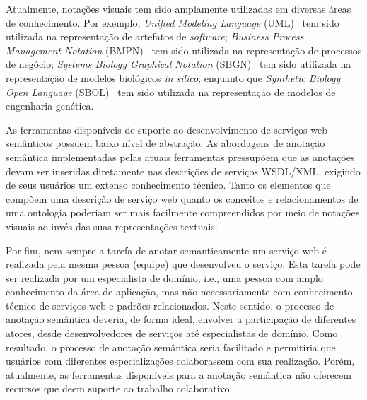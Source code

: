Atualmente, notações visuais tem sido amplamente utilizadas em diversas áreas de conhecimento. Por exemplo, \textit{Unified Modeling Language} (UML)~\cite{OMG-2017-UML} tem sido utilizada na representação de artefatos de \textit{software}; \textit{Business Process Management Notation} (BMPN)~\cite{OMG-2011-BPMN} tem sido utilizada na representação de processos de negócio; \textit{Systems Biology Graphical Notation} (SBGN)~\cite{NOVERE-BUCKA-MI-MOODIE-SCHREIBER-SOROKIN-2009-SBGN, VASUNDRA-LENOVERE-WALTEMATH-WOLKENHAUER-2018-SBGN} tem sido utilizada na representação de modelos biológicos \textit{in silico}; enquanto que \textit{Synthetic Biology Open Language} (SBOL)~\cite{QUINN-COX-ADLER-2015-SBOL} tem sido utilizada na representação de modelos de engenharia genética.

As ferramentas disponíveis de suporte ao desenvolvimento de serviços web semânticos possuem baixo nível de abstração. As abordagens de anotação semântica implementadas pelas atuais ferramentas pressupõem que as anotações devam ser inseridas diretamente nas descrições de serviços WSDL/XML, exigindo de seus usuários um extenso conhecimento técnico. Tanto os elementos que compõem uma descrição de serviço web quanto os conceitos e relacionamentos de uma ontologia poderiam ser mais facilmente compreendidos por meio de notações visuais ao invés das suas representações textuais.


Por fim, nem sempre a tarefa de anotar semanticamente um serviço web é realizada pela mesma pessoa (equipe) que desenvolveu o serviço. Esta tarefa pode ser realizada por um especialista de domínio, i.e., uma pessoa com amplo conhecimento da área de aplicação, mas não necessariamente com conhecimento técnico de serviços web e padrões relacionados. Neste sentido, o processo de anotação semântica deveria, de forma ideal, envolver a participação de diferentes atores, desde desenvolvedores de serviços até especialistas de domínio. Como resultado, o processo de anotação semântica seria facilitado e permitiria que usuários com diferentes especializações colaborassem com sua realização. Porém, atualmente, as ferramentas disponíveis para a anotação semântica não oferecem recursos que deem suporte ao trabalho colaborativo.


